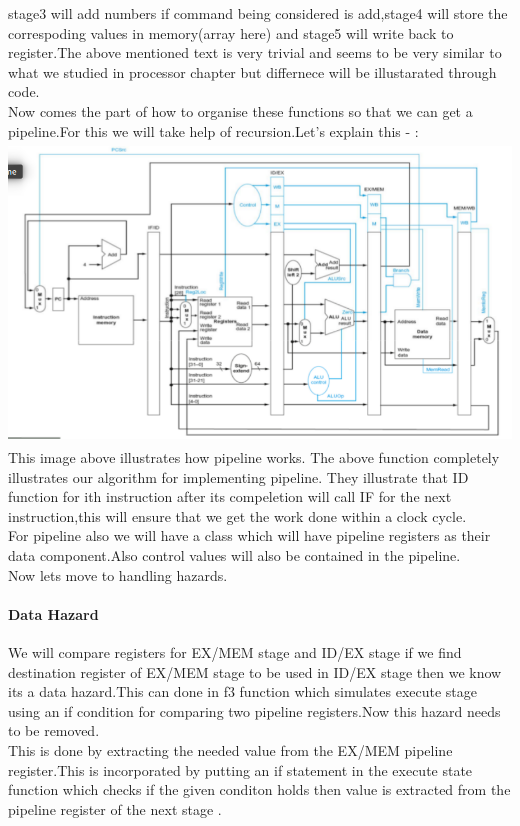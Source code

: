 \documentclass[12pt]{extarticle}
\begin{document}
stage3 will add numbers if command being considered is add,stage4 will store the correspoding values in memory(array here) and stage5 will write back to register.The above mentioned text is very trivial and seems to be very similar to what we studied in processor chapter but differnece will be illustarated through code.
\\
Now comes the part of how to organise these functions so that we can get a pipeline.For this we will take help of recursion.Let's explain this - :
\includegraphics[height=8cm, width=14cm]{PC2.png}
\\
This image above illustrates how pipeline works.
The above function completely illustrates our algorithm for implementing pipeline. They illustrate that ID function for ith instruction after its compeletion will call IF for the next instruction,this will ensure that we get the work done within a clock cycle.
\\
For pipeline also we will have a class which will have pipeline registers as their data component.Also control values will also be contained in the pipeline.
\\
Now lets move to handling hazards.\\
\paragraph{Data Hazard}
We will compare registers for EX/MEM stage and ID/EX stage if we find destination register of EX/MEM stage to be used in ID/EX stage then we know its a data hazard.This can done in f3 function which simulates execute stage using an if condition for comparing two pipeline registers.Now this hazard needs to be removed.\\
													This is done by extracting the needed value from the 
EX/MEM pipeline register.This is incorporated by putting an if statement in the execute state function which checks if the given conditon holds then value is extracted from the pipeline register of the next stage .

\end{document}
